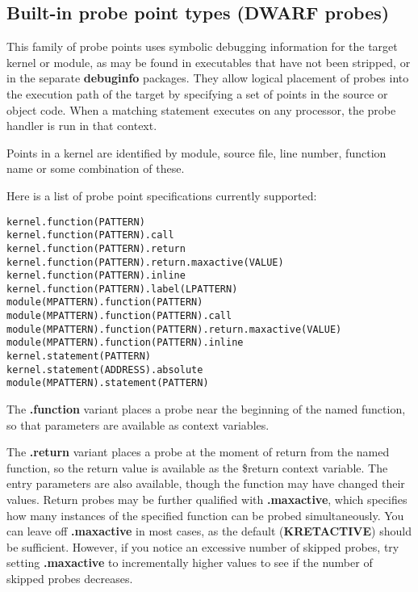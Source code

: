 \documentclass[twoside,english]{article}
\newenvironment{vindent}
{\begin{list}{}{\setlength{\listparindent}{6pt}}
\item[]}
{\end{list}}
\begin{document}
\subsection{Built-in probe point types (DWARF probes)}
\label{dwarfprobes}
This family of probe points uses symbolic debugging information for the target
kernel or module, as may be found in executables that have not
been stripped, or in the separate \textbf{debuginfo} packages. They allow
logical placement of probes into the execution path of the target
by specifying a set of points in the source or object code. When a matching
statement executes on any processor, the probe handler is run in that context.

Points in a kernel are identified by module, source file, line number, function
name or some combination of these.

Here is a list of probe point specifications currently supported:

\begin{vindent}
\begin{verbatim}
kernel.function(PATTERN)
kernel.function(PATTERN).call
kernel.function(PATTERN).return
kernel.function(PATTERN).return.maxactive(VALUE)
kernel.function(PATTERN).inline
kernel.function(PATTERN).label(LPATTERN)
module(MPATTERN).function(PATTERN)
module(MPATTERN).function(PATTERN).call
module(MPATTERN).function(PATTERN).return.maxactive(VALUE)
module(MPATTERN).function(PATTERN).inline
kernel.statement(PATTERN)
kernel.statement(ADDRESS).absolute
module(MPATTERN).statement(PATTERN)
\end{verbatim}
\end{vindent}

The \textbf{.function} variant places a probe near the beginning of the named
function, so that parameters are available as context variables.

The \textbf{.return} variant places a probe at the moment of return from the named
function, so the return value is available as the \$return context variable.
The entry parameters are also available, though the function may have changed
their values.  Return probes may be further qualified with \textbf{.maxactive},
which specifies how many instances of the specified function can be probed simultaneously.
You can leave off \textbf{.maxactive} in most cases, as the default
(\textbf{KRETACTIVE}) should be sufficient.
However, if you notice an excessive number of skipped probes, try setting \textbf{.maxactive}
to incrementally higher values to see if the number of skipped probes decreases.
\end{document}
